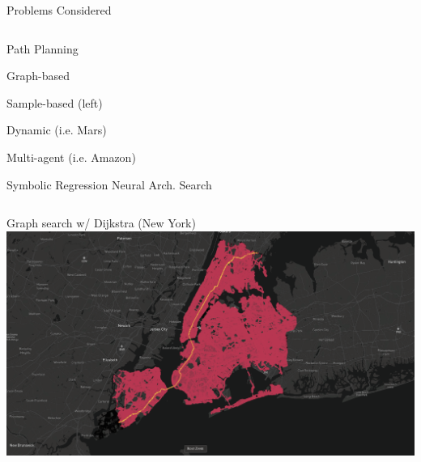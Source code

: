 \documentclass[aspectratio=169]{beamer}
\makeatletter
\renewcommand{\emph}[1]{{\Huge \color{pureminimalistic@text@red} #1}}
\newcommand{\white}[1]{{\color{pureminimalistic@text@white} #1}}
\makeatother
\begin{document}
\begin{frame}[plain]{\white{Problems Considered}}
\begin{columns}[T]
\begin{column}{.5\linewidth}
          \emph{Path Planning}
          \begin{vfilleditems}
              \item {\Large Graph-based}
              \vspace{1em}
              \item {\Large Sample-based \Medium (left)}
              \vspace{1em}
              \item {\color{grey} {\Large Dynamic (i.e. Mars)}}
              \vspace{1em}
              \item {\color{grey} {\Large Multi-agent (i.e. Amazon)}}
          \end{vfilleditems}
          \vspace{1em}
          {\color{grey} {\Large Symbolic Regression}}
          \vspace{1em}
          {\color{grey} {\Large Neural Arch. Search}}
      \end{column}
  \end{columns}
\end{frame}

\begin{frame}[plain]{Graph search w/ Dijkstra \white{(New York)}}
    \includegraphics[width=1.0\linewidth, keepaspectratio, trim={0cm, 2cm, 1cm, 0.5cm}, clip]{figures/ny_graph_based.png}
\end{frame}
\end{document}
